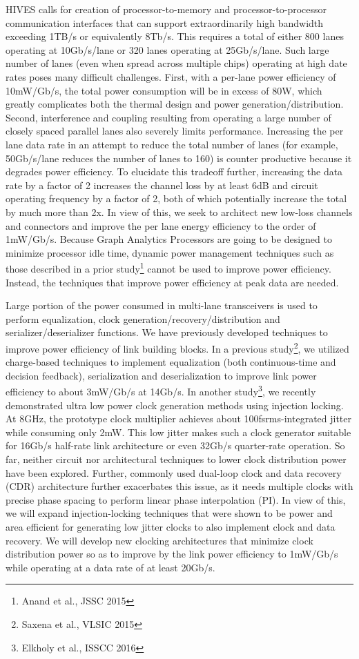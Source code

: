 HIVES calls for creation of processor-to-memory and processor-to-processor communication interfaces that can support extraordinarily high bandwidth exceeding 1TB/s or equivalently 8Tb/s. 
This requires a total of either 800 lanes operating at 10Gb/s/lane or 320 lanes operating at 25Gb/s/lane.  
Such large number of lanes (even when spread across multiple chips) operating at high date rates poses many difficult challenges. 
First, with a per-lane power efficiency of 10mW/Gb/s, the total power consumption will be in excess of 80W, which greatly complicates both the thermal design and power generation/distribution. 
Second, interference and coupling resulting from operating a large number of closely spaced parallel lanes also severely limits performance. 
Increasing the per lane data rate in an attempt to reduce the total number of lanes (for example, 50Gb/s/lane reduces the number of lanes to 160) is counter productive because it degrades power efficiency. 
To elucidate this tradeoff further, increasing the data rate by a factor of 2 increases the channel loss by at least 6dB and circuit operating frequency by a factor of 2, both of which potentially increase the total by much more than 2x. 
In view of this, we seek to architect new low-loss channels and connectors and improve the per lane energy efficiency to the order of 1mW/Gb/s. 
Because Graph Analytics Processors are going to be designed to minimize processor idle time, dynamic power management techniques such as those described in a prior study\footnote{Anand et al., JSSC 2015} cannot be used to improve power efficiency. 
Instead, the techniques that improve power efficiency at peak data are needed.

Large portion of the power consumed in multi-lane transceivers is used to perform equalization, clock generation/recovery/distribution and serializer/deserializer functions. 
We have previously developed techniques to improve power efficiency of link building blocks. 
In a previous study\footnote{Saxena et al., VLSIC 2015}, we utilized charge-based techniques to implement equalization (both continuous-time and decision feedback), serialization and deserialization to improve link power efficiency to about 3mW/Gb/s at 14Gb/s. 
In another study\footnote{Elkholy et al., ISSCC 2016}, we recently demonstrated ultra low power clock generation methods using injection locking. 
At 8GHz, the prototype clock multiplier achieves about 100fsrms-integrated jitter while consuming only 2mW. 
This low jitter makes such a clock generator suitable for 16Gb/s half-rate link architecture or even 32Gb/s quarter-rate operation. 
So far, neither circuit nor architectural techniques to lower clock distribution power have been explored. 
Further, commonly used dual-loop clock and data recovery (CDR) architecture further exacerbates this issue, as it needs multiple clocks with precise phase spacing to perform linear phase interpolation (PI). 
In view of this, we will expand injection-locking techniques that were shown to be power and area efficient for generating low jitter clocks to also implement clock and data recovery. 
We will develop new clocking architectures that minimize clock distribution power so as to improve by the link power efficiency to 1mW/Gb/s while operating at a data rate of at least 20Gb/s.

